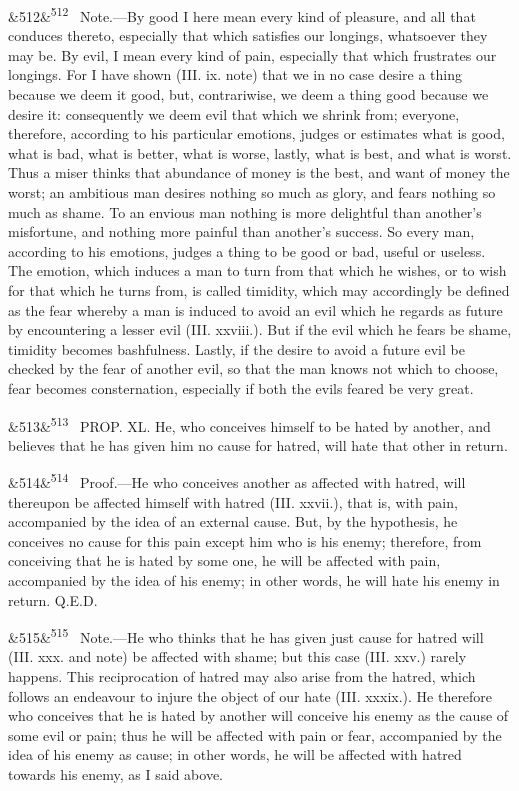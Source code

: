 \documentclass[12pt]{article}
\newcommand{\para}[1][]{\par\noindent\ifx&#1&\else\textsuperscript{\footnotesize #1}~\fi}
\begin{document}
\para[512] Note.---By good I here mean every kind of pleasure, and all that conduces thereto, especially that which satisfies our longings, whatsoever they may be. By evil, I mean every kind of pain, especially that which frustrates our longings. For I have shown (III. ix. note) that we in no case desire a thing because we deem it good, but, contrariwise, we deem a thing good because we desire it: consequently we deem evil that which we shrink from; everyone, therefore, according to his particular emotions, judges or estimates what is good, what is bad, what is better, what is worse, lastly, what is best, and what is worst. Thus a miser thinks that abundance of money is the best, and want of money the worst; an ambitious man desires nothing so much as glory, and fears nothing so much as shame. To an envious man nothing is more delightful than another's misfortune, and nothing more painful than another's success. So every man, according to his emotions, judges a thing to be good or bad, useful or useless. The emotion, which induces a man to turn from that which he wishes, or to wish for that which he turns from, is called timidity, which may accordingly be defined as the fear whereby a man is induced to avoid an evil which he regards as future by encountering a lesser evil (III. xxviii.). But if the evil which he fears be shame, timidity becomes bashfulness. Lastly, if the desire to avoid a future evil be checked by the fear of another evil, so that the man knows not which to choose, fear becomes consternation, especially if both the evils feared be very great.

\para[513] PROP. XL. He, who conceives himself to be hated by another, and believes that he has given him no cause for hatred, will hate that other in return.

\para[514] Proof.---He who conceives another as affected with hatred, will thereupon be affected himself with hatred (III. xxvii.), that is, with pain, accompanied by the idea of an external cause. But, by the hypothesis, he conceives no cause for this pain except him who is his enemy; therefore, from conceiving that he is hated by some one, he will be affected with pain, accompanied by the idea of his enemy; in other words, he will hate his enemy in return. Q.E.D.

\para[515] Note.---He who thinks that he has given just cause for hatred will (III. xxx. and note) be affected with shame; but this case (III. xxv.) rarely happens. This reciprocation of hatred may also arise from the hatred, which follows an endeavour to injure the object of our hate (III. xxxix.). He therefore who conceives that he is hated by another will conceive his enemy as the cause of some evil or pain; thus he will be affected with pain or fear, accompanied by the idea of his enemy as cause; in other words, he will be affected with hatred towards his enemy, as I said above.
\end{document}
